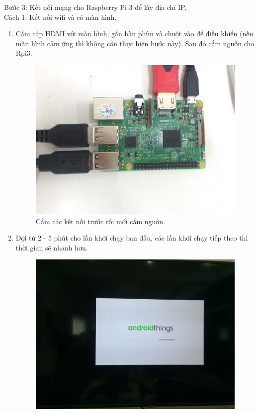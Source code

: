 Bước 3: Kết nối mạng cho Raspberry Pi 3 để lấy địa chỉ IP.\\
\hspace*{0.25cm}Cách 1: Kết nối wifi và có màn hình. 
\begin{enumerate}
\item Cắm cáp HDMI với màn hình, gắn bàn phím và chuột vào để điều khiển (nếu màn hình cảm ứng thì không cần thực hiện bước này). Sau đó cắm nguồn cho Rpi3.
\begin{center}
\begin{figure}[htp]
\begin{center}
\includegraphics[scale=0.065]{image3/buoc3s1.JPG}
\end{center}
\caption{Cắm các kết nối trước rồi mới cắm nguồn.}
\label{refhinh1}
\end{figure}
\end{center}
\item Đợi từ 2 - 5 phút cho lần khởi chạy ban đầu, các lần khởi chạy tiếp theo thì thời gian sẽ nhanh hơn.
\begin{center}
\begin{figure}[htp]
\begin{center}
\includegraphics[scale=0.075]{image3/buoc3s2.JPG}

\end{center}
\end{figure}
\end{center}
\end{enumerate}
